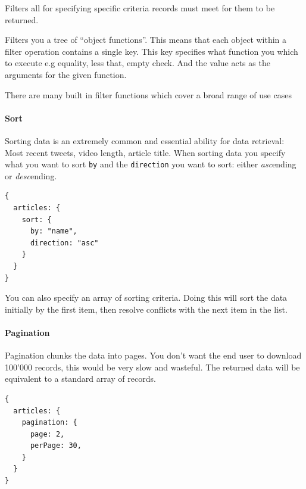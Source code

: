 \documentclass[
  12pt,
]{article}
\newcommand{\passthrough}[1]{#1}
\let\oldparagraph\paragraph
\renewcommand{\paragraph}[1]{\oldparagraph{#1}\mbox{}}
\begin{document}
Filters all for specifying specific criteria records must meet for them
to be returned.

Filters you a tree of ``object functions''. This means that each object
within a filter operation contains a single key. This key specifies what
function you which to execute e.g equality, less that, empty check. And
the value acts as the arguments for the given function.

There are many built in filter functions which cover a broad range of
use cases

\hypertarget{sort}{%
\paragraph{Sort}\label{sort}}

Sorting data is an extremely common and essential ability for data
retrieval: Most recent tweets, video length, article title. When sorting
data you specify what you want to sort \passthrough{\lstinline!by!} and
the \passthrough{\lstinline!direction!} you want to sort: either
\emph{asc}ending or \emph{desc}ending.

\begin{lstlisting}[caption={This query will return all articles ordered by the articles "name" attribute.}]
{
  articles: {
    sort: {
      by: "name",
      direction: "asc"
    }
  }
}
\end{lstlisting}

You can also specify an array of sorting criteria. Doing this will sort
the data initially by the first item, then resolve conflicts with the
next item in the list.

\label{pagination}

\hypertarget{pagination}{%
\paragraph{Pagination}\label{pagination}}

Pagination chunks the data into pages. You don't want the end user to
download 100'000 records, this would be very slow and wasteful. The
returned data will be equivalent to a standard array of records.

\begin{lstlisting}[caption={This query will return the second page of articles where each page holds 30 records.}]
{
  articles: {
    pagination: {
      page: 2,
      perPage: 30,
    }
  }
}
\end{lstlisting}
\end{document}
